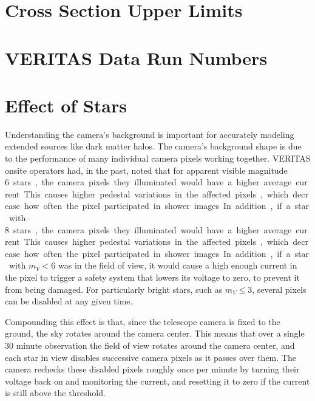 \cleartooddpage[\thispagestyle{empty}]
\renewcommand{\thechapter}{\thechapter}
\renewcommand{\thesection}{\thechapter.\arabic{section}}
\renewcommand{\thesubsection}{\thechapter.\arabic{section}.\arabic{subsection}}
\renewcommand{\thesubsubsection}{\thechapter.\arabic{section}.\arabic{subsection}.\arabic{subsubsection}}
\renewcommand{\thefigure}{\thechapter.\arabic{figure}}
\renewcommand{\thetable}{\thechapter.\arabic{table}}
\renewcommand{\theequation}{\thechapter.\arabic{equation}}
\appendix

\chapter{Cross Section Upper Limits}



\chapter{VERITAS Data Run Numbers}\label{app:runlists}



\chapter{Effect of Stars}\label{app:starpixels}

  Understanding the camera's background is important for accurately modeling extended sources like dark matter halos.
  The camera's background shape is due to the performance of many individual camera pixels working together.
  VERITAS onsite operators had, in the past, noted that for apparent visible magnitude \SIrange{6}{8} stars, the camera pixels they illuminated would have a higher average current.
  This causes higher pedestal variations in the affected pixels, which decrease how often the pixel participated in shower images.
  In addition, if a star with $m_V < 6$ was in the field of view, it would cause a high enough current in the pixel to trigger a safety system that lowers its voltage to zero, to prevent it from being damaged.
  For particularly bright stars, such as $m_V \leq 3$, several pixels can be disabled at any given time.

  Compounding this effect is that, since the telescope camera is fixed to the ground, the sky rotates around the camera center.
  This means that over a single 30 minute observation the field of view rotates around the camera center, and each star in view disables successive camera pixels as it passes over them.
  The camera rechecks these disabled pixels roughly once per minute by turning their voltage back on and monitoring the current, and resetting it to zero if the current is still above the threshold.

